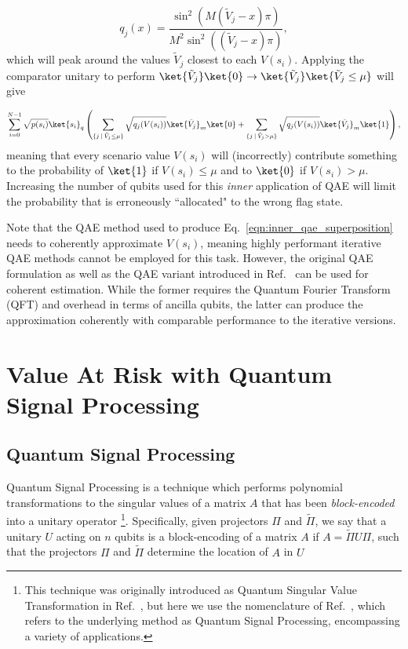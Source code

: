 \begin{enumerate}
\begin{equation}
	\label{eqn:qae_probabilities}
	q_j(x) = \frac{\sin^2\left(M(\tilde{V}_j-x)\pi\right)}{M^2\sin^2\left((\tilde{V}_j-x)\pi\right)},
\end{equation}
which will peak around the values $\tilde{V}_j$ closest to each $V(s_i)$.
Applying the comparator unitary to perform $\ket{\tilde{V}_j}\ket{0}\rightarrow\ket{\tilde{V}_j}\ket{\tilde{V}_j \le \mu}$ will give

\begin{equation}
	\sum_{i=0}^{N-1}\sqrt{p(s_i)}\ket{s_i}_q \left(\sum_{\{j  \: | \: \tilde{V}_j \le \mu\}}\sqrt{q_j(V(s_i))}\ket{\tilde{V}_j}_m\ket{0} + \sum_{\{j  \: | \: \tilde{V}_j > \mu\}}\sqrt{q_j(V(s_i))}\ket{\tilde{V}_j}_m\ket{1}\right),
\end{equation}
meaning that every scenario value $V(s_i)$ will (incorrectly) contribute something to the probability of $\ket{1}$ if $V(s_i) \le \mu$ and to $\ket{0}$ if $V(s_i) > \mu$.
Increasing the number of qubits used for this \emph{inner} application of QAE will limit the probability that is erroneously ``allocated" to the wrong flag state.

Note that the QAE method used to produce Eq.~\eqref{eqn:inner_qae_superposition} needs to coherently approximate $V(s_i)$, meaning highly performant iterative QAE methods \cite{grinko2021iterative, suzuki2020amplitude, Giurgica_Tiron_2022} cannot be employed for this task.
However, the original QAE formulation \cite{brassard2002quantum} as well as the QAE variant introduced in Ref.~\cite{Rall_2021} can be used for coherent estimation.
While the former requires the Quantum Fourier Transform (QFT) and overhead in terms of ancilla qubits, the latter can produce the approximation coherently with comparable performance to the iterative versions.

\section{Value At Risk with Quantum Signal Processing}
\label{sec:qsp_var}
\subsection{Quantum Signal Processing}
Quantum Signal Processing is a technique which performs polynomial transformations to the singular values of a matrix $A$ that has been \emph{block-encoded} into a unitary operator \footnote{This technique was originally introduced as Quantum Singular Value Transformation in Ref.~\cite{gilyen2019quantum}, but here we use the nomenclature of Ref.~\cite{martyn2021grand}, which refers to the underlying method as Quantum Signal Processing, encompassing a variety of applications.}.
Specifically, given projectors $\Pi$ and $\tilde{\Pi}$, we say that a unitary $U$ acting on $n$ qubits is a block-encoding of a matrix $A$ if $A=\tilde{\Pi}U\Pi$, such that the projectors $\Pi$ and $\tilde{\Pi}$ determine the location of $A$ in $U$


\end{enumerate}
